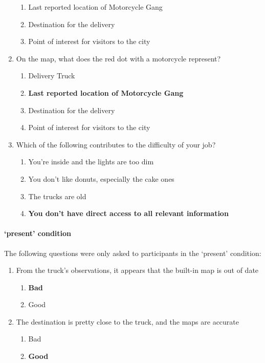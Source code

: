 \begin{quoting}
\begin{enumerate}
\begin{enumerate}[label=(\alph*)]
        \item Last reported location of Motorcycle Gang
        \item Destination for the delivery
        \item Point of interest for visitors to the city
    \end{enumerate}
    \item On the map, what does the red dot with a motorcycle represent?
    \begin{enumerate}[label=(\alph*)]
        \item Delivery Truck
        \item \textbf{Last reported location of Motorcycle Gang}
        \item Destination for the delivery
        \item Point of interest for visitors to the city
    \end{enumerate}
    \item Which of the following contributes to the difficulty of your job?
    \begin{enumerate}[label=(\alph*)]
        \item You're inside and the lights are too dim
        \item You don't like donuts, especially the cake ones
        \item The trucks are old
        \item \textbf{You don't have direct access to all relevant information}
    \end{enumerate}
\end{enumerate}
\end{quoting}

\paragraph{\xQ{} `present' condition} The following questions were only asked to participants in the \xQ{} `present' condition:
\begin{quoting}
\begin{enumerate}
    \item From the truck’s observations, it appears that the built-in map is out of date
    \begin{enumerate}[label=(\alph*)]
        \item \textbf{Bad}
        \item Good
    \end{enumerate}
    \item The destination is pretty close to the truck, and the maps are accurate
    \begin{enumerate}[label=(\alph*)]
        \item Bad
        \item \textbf{Good}
    \end{enumerate}
\end{enumerate}
\end{quoting}

